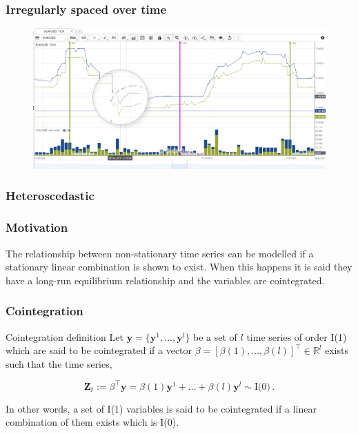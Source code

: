 \documentclass{beamer}
\begin{document}
\begin{frame}
\frametitle{Irregularly spaced over time}
\begin{figure}
\includegraphics[width=\paperwidth]{img/hft-ticks-zoom.png}
\end{figure}
\end{frame}

\begin{frame}
\frametitle{Heteroscedastic}
\end{frame}


\begin{frame}
\frametitle{Motivation}

The relationship between non-stationary time series can be modelled if a stationary linear combination is shown to exist.
When this happens it is said they have a long-run
equilibrium relationship and the variables are {\color{red} cointegrated}.
\end{frame}

\begin{frame}
\frametitle{Cointegration}
\begin{block}{Cointegration definition}
Let {\color{blue}$\mathbf{y} = \{\mathbf{y}^1, \dots, \mathbf{y}^l\}$} be a set of $l$
time series of order I(1) which are said to be cointegrated if a vector
$\beta=[\beta(1),\dots,\beta(l)]^\top \in \mathbb{R}^l$  exists such that the
time series,

\begin{equation*}
 \mathbf{Z}_t:= \beta^\top \mathbf{y} = \beta(1) \mathbf{y}^1 + \dots + \beta(l) \mathbf{y}^l \sim
 \text{I(0)}\, .
\end{equation*}
\end{block}
In other words, a set of I(1) variables is said to be cointegrated if
a linear combination of them exists which is I(0).

\end{frame}
\end{document}
